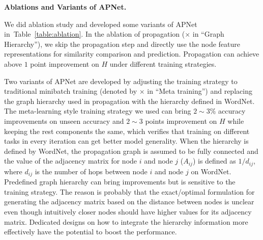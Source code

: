 \documentclass[letterpaper]{article} %
\def\Tabref#1{Table~\ref{#1}}
\begin{document}
\noindent\textbf{Ablations and Variants of APNet.}

\noindent We did ablation study and developed some variants of APNet in~\Tabref{table:ablation}.
In the ablation of propagation ($\times$ in ``Graph Hierarchy''), we skip the propagation step and directly use the node feature representations for similarity comparison and prediction.
Propagation can achieve above $1$ point improvement on $H$ under different training strategies.


Two variants of APNet are developed by adjusting the training strategy to traditional minibatch training (denoted by $\times$ in ``Meta training'') and replacing the graph hierarchy used in propagation with the hierarchy defined in WordNet.
The meta-learning style training strategy we used can bring $2 \sim 3\%$ accuracy improvements on unseen accuracy and $2 \sim 3$ points improvement on $H$ while keeping the rest components the same, which verifies that training on different tasks in every iteration can get better model generality.
When the hierarchy is defined by WordNet, the propagation graph is assumed to be fully connected and the value of the adjacency matrix for node $i$ and node $j$ ($A_{ij}$) is defined as $1/d_{ij}$, where $d_{ij}$ is the number of hops between node $i$ and node $j$ on WordNet.
Predefined graph hierarchy can bring improvements but is sensitive to the training strategy.
The reason is probably that the exact/optimal formulation for generating the adjacency matrix based on the distance between nodes is unclear even though intuitively closer nodes should have higher values for its  adjacency matrix.
Dedicated designs on how to integrate the hierarchy information more effectively have the potential to boost the performance.
\end{document}

